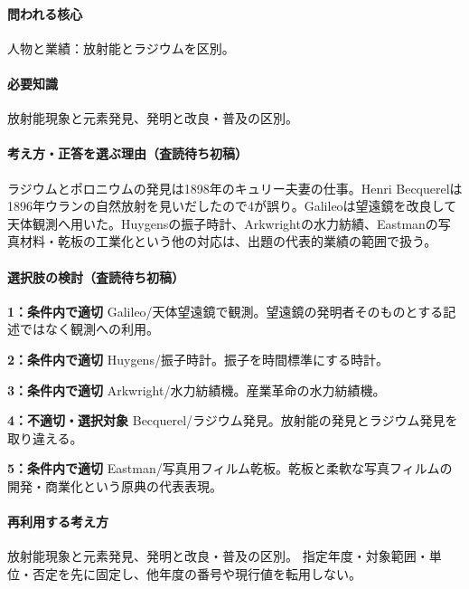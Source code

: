 \paragraph{問われる核心} 人物と業績：放射能とラジウムを区別。

\paragraph{必要知識} 放射能現象と元素発見、発明と改良・普及の区別。

\paragraph{考え方・正答を選ぶ理由（査読待ち初稿）} ラジウムとポロニウムの発見は1898年のキュリー夫妻の仕事。Henri Becquerelは1896年ウランの自然放射を見いだしたので4が誤り。Galileoは望遠鏡を改良して天体観測へ用いた。Huygensの振子時計、Arkwrightの水力紡績、Eastmanの写真材料・乾板の工業化という他の対応は、出題の代表的業績の範囲で扱う。

\paragraph{選択肢の検討（査読待ち初稿）}\mbox{}\par

\noindent\textbf{1：条件内で適切} Galileo/天体望遠鏡で観測。望遠鏡の発明者そのものとする記述ではなく観測への利用。\par

\noindent\textbf{2：条件内で適切} Huygens/振子時計。振子を時間標準にする時計。\par

\noindent\textbf{3：条件内で適切} Arkwright/水力紡績機。産業革命の水力紡績機。\par

\noindent\textbf{4：不適切・選択対象} Becquerel/ラジウム発見。放射能の発見とラジウム発見を取り違える。\par

\noindent\textbf{5：条件内で適切} Eastman/写真用フィルム乾板。乾板と柔軟な写真フィルムの開発・商業化という原典の代表表現。\par

\paragraph{再利用する考え方} 放射能現象と元素発見、発明と改良・普及の区別。 指定年度・対象範囲・単位・否定を先に固定し、他年度の番号や現行値を転用しない。

